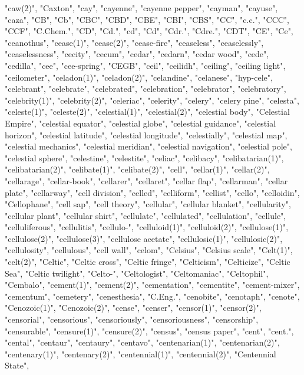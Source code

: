 "caw(2)",
"Caxton",
"cay",
"cayenne",
"cayenne pepper",
"cayman",
"cayuse",
"caza",
"CB",
"Cb",
"CBC",
"CBD",
"CBE",
"CBI",
"CBS",
"CC",
"c.c.",
"CCC",
"CCF",
"C.Chem.",
"CD",
"Cd.",
"cd",
"Cd",
"Cdr.",
"Cdre.",
"CDT",
"CE",
"Ce",
"ceanothus",
"cease(1)",
"cease(2)",
"cease-fire",
"ceaseless",
"ceaselessly",
"ceaselessness",
"cecity",
"cecum",
"cedar",
"cedarn",
"cedar wood",
"cede",
"cedilla",
"cee",
"cee-spring",
"CEGB",
"ceil",
"ceilidh",
"ceiling",
"ceiling light",
"ceilometer",
"celadon(1)",
"celadon(2)",
"celandine",
"celanese",
"hyp-cele",
"celebrant",
"celebrate",
"celebrated",
"celebration",
"celebrator",
"celebratory",
"celebrity(1)",
"celebrity(2)",
"celeriac",
"celerity",
"celery",
"celery pine",
"celesta",
"celeste(1)",
"celeste(2)",
"celestial(1)",
"celestial(2)",
"celestial body",
"Celestial Empire",
"celestial equator",
"celestial globe",
"celestial guidance",
"celestial horizon",
"celestial latitude",
"celestial longitude",
"celestially",
"celestial map",
"celestial mechanics",
"celestial meridian",
"celestial navigation",
"celestial pole",
"celestial sphere",
"celestine",
"celestite",
"celiac",
"celibacy",
"celibatarian(1)",
"celibatarian(2)",
"celibate(1)",
"celibate(2)",
"cell",
"cellar(1)",
"cellar(2)",
"cellarage",
"cellar-book",
"cellarer",
"cellaret",
"cellar flap",
"cellarman",
"cellar plate",
"cellarway",
"cell division",
"celled",
"celliform",
"cellist",
"cello",
"celloidin",
"Cellophane",
"cell sap",
"cell theory",
"cellular",
"cellular blanket",
"cellularity",
"cellular plant",
"cellular shirt",
"cellulate",
"cellulated",
"cellulation",
"cellule",
"celluliferous",
"cellulitis",
"cellulo-",
"celluloid(1)",
"celluloid(2)",
"cellulose(1)",
"cellulose(2)",
"cellulose(3)",
"cellulose acetate",
"cellulosic(1)",
"cellulosic(2)",
"cellulosity",
"cellulous",
"cell wall",
"celom",
"Celsius",
"Celsius scale",
"Celt(1)",
"celt(2)",
"Celtic",
"Celtic cross",
"Celtic fringe",
"Celticism",
"Celticize",
"Celtic Sea",
"Celtic twilight",
"Celto-",
"Celtologist",
"Celtomaniac",
"Celtophil",
"Cembalo",
"cement(1)",
"cement(2)",
"cementation",
"cementite",
"cement-mixer",
"cementum",
"cemetery",
"cenesthesia",
"C.Eng.",
"cenobite",
"cenotaph",
"cenote",
"Cenozoic(1)",
"Cenozoic(2)",
"cense",
"censer",
"censor(1)",
"censor(2)",
"censorial",
"censorious",
"censoriously",
"censoriousness",
"censorship",
"censurable",
"censure(1)",
"censure(2)",
"census",
"census paper",
"cent",
"cent.",
"cental",
"centaur",
"centaury",
"centavo",
"centenarian(1)",
"centenarian(2)",
"centenary(1)",
"centenary(2)",
"centennial(1)",
"centennial(2)",
"Centennial State",
